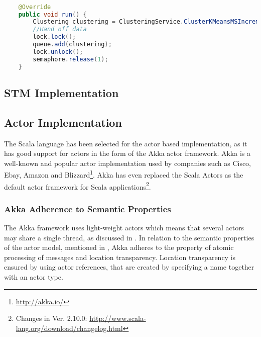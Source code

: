 \begin{lstlisting}[float,label=lst:tl_implementation,
  caption={\ac{TL} Implementation},
  language=Java,  
  showspaces=false,
  showtabs=false,
  breaklines=true,
  showstringspaces=false,
  breakatwhitespace=true,
  commentstyle=\color{greencomments},
  keywordstyle=\color{bluekeywords},
  stringstyle=\color{redstrings}]  % Start your code-block

    @Override
    public void run() {
        Clustering clustering = ClusteringService.ClusterKMeansMSIncremental(data, means);
        //Hand off data
        lock.lock();
        queue.add(clustering);
        lock.unlock();
        semaphore.release(1);
    }  
\end{lstlisting}

\subsection{\ac{STM} Implementation}

\subsection{Actor Implementation}
The Scala language has been selected for the actor based implementation, as it has good support for actors in the form of the Akka actor framework. Akka is a well-known and popular actor implementation used by companies such as Cisco, Ebay, Amazon and Blizzard\footnote{\url{http://akka.io/}}. Akka has even replaced the Scala Actors as the default actor framework for Scala applications\footnote{Changes in Ver. 2.10.0: \url{http://www.scala-lang.org/download/changelog.html}}.

\subsubsection{Akka Adherence to Semantic Properties}
The Akka framework uses light-weight actors which means that several actors may share a single thread\cite[p. 13]{akkaDoc}, as discussed in . 
In relation to the semantic properties of the actor model, mentioned in , Akka adheres to the property of atomic processing of messages and location transparency. Location transparency is ensured by using actor references, that are created by specifying a name together with an actor type\cite[p. 24]{akkaDoc}. 

